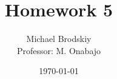 


\title{Homework 5}
\date{\today}
\author{Michael Brodskiy\\ \small Professor: M. Onabajo}



\maketitle

